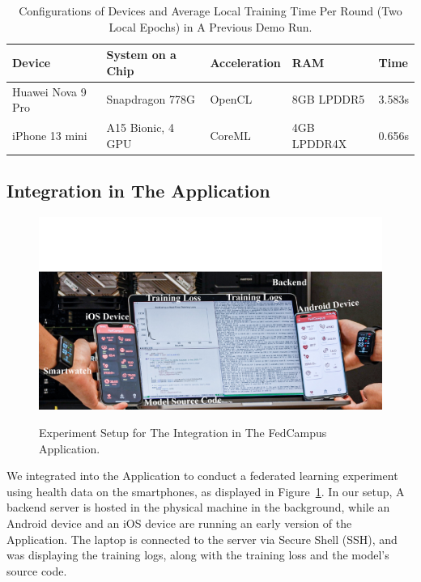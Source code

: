 \begin{table}\begin{center}
        \begin{tabular}{lllll}\toprule
            Device            & System on a Chip  & Acceleration & RAM         & Time   \\\midrule
            Huawei Nova 9 Pro & Snapdragon 778G   & OpenCL       & 8GB LPDDR5  & 3.583s \\
            iPhone 13 mini    & A15 Bionic, 4 GPU & CoreML       & 4GB LPDDR4X & 0.656s \\\bottomrule
        \end{tabular}
        \caption{Configurations of Devices and Average Local Training Time Per Round
            (Two Local Epochs) in A Previous Demo Run.
        }
        \label{tbl:demo-stats}
    \end{center}\end{table}

\subsection{\fedkit Integration in The \fedcampus Application}

\begin{figure}\begin{center}
        \label{fig:integration}
        \includegraphics[width=\linewidth]{fedcampus.pdf}
        \caption{Experiment Setup for The \fedkit Integration in The FedCampus
            Application.
        }
    \end{center}\end{figure}

We integrated \fedkit into the \fedcampus Application to
conduct a federated learning experiment using health data on the smartphones,
as displayed in Figure~\ref{fig:integration}.
In our setup,
A backend server is hosted in the physical machine in the background,
while an Android device and an iOS device are running an early version of
the \fedcampus Application.
The laptop is connected to the server via Secure Shell (SSH),
and was displaying the training logs,
along with the training loss and the model's source code.


